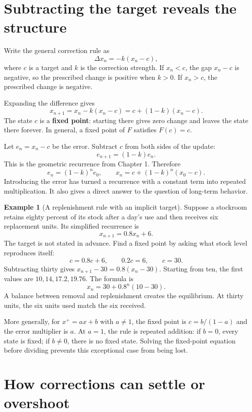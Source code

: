\documentclass[11pt,oneside,openany]{book}
\theoremstyle{definition}
\newtheorem{example}{Example}[chapter]
\theoremstyle{remark}
\numberwithin{equation}{chapter}
\begin{document}
\section{Subtracting the target reveals the structure}\label{ch02-subtracting-the-target-reveals-the-structure}

Write the general correction rule as \[\Delta x_n=-k(x_n-c),\] where \(c\) is a target and \(k\) is the correction strength. If \(x_n<c\), the gap \(x_n-c\) is negative, so the prescribed change is positive when \(k>0\). If \(x_n>c\), the prescribed change is negative.

Expanding the difference gives \[x_{n+1}=x_n-k(x_n-c)=c+(1-k)(x_n-c).\] The state \(c\) is a \textbf{fixed point}: starting there gives zero change and leaves the state there forever. In general, a fixed point of \(F\) satisfies \(F(c)=c\).

Let \(e_n=x_n-c\) be the error. Subtract \(c\) from both sides of the update: \[e_{n+1}=(1-k)e_n.\] This is the geometric recurrence from Chapter 1. Therefore \[e_n=(1-k)^n e_0,\qquad
\boxed{x_n=c+(1-k)^n(x_0-c).}\] Introducing the error has turned a recurrence with a constant term into repeated multiplication. It also gives a direct answer to the question of long-term behavior.

\begin{example}[A replenishment rule with an implicit target]

Suppose a stockroom retains eighty percent of its stock after a day's use and then receives six replacement units. Its simplified recurrence is \[x_{n+1}=0.8x_n+6.\] The target is not stated in advance. Find a fixed point by asking what stock level reproduces itself: \[c=0.8c+6,\qquad 0.2c=6,\qquad c=30.\] Subtracting thirty gives \(x_{n+1}-30=0.8(x_n-30)\). Starting from ten, the first values are \(10,14,17.2,19.76\). The formula is \[x_n=30+0.8^n(10-30).\] A balance between removal and replenishment creates the equilibrium. At thirty units, the six units used match the six received.

\end{example}

More generally, for \(x^+=ax+b\) with \(a\ne1\), the fixed point is \(c=b/(1-a)\) and the error multiplier is \(a\). At \(a=1\), the rule is repeated addition: if \(b=0\), every state is fixed; if \(b\ne0\), there is no fixed state. Solving the fixed-point equation before dividing prevents this exceptional case from being lost.

\section{How corrections can settle or overshoot}\label{ch02-how-corrections-can-settle-or-overshoot}
\end{document}
